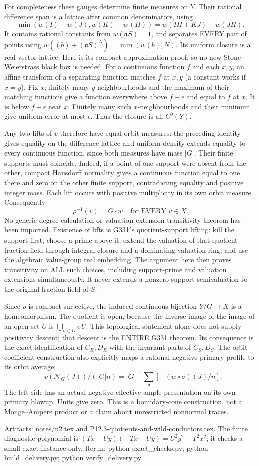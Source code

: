 For completeness these gauges determine finite measures on $Y$.
Their rational difference span is a lattice after common denominators,
using
\[
 \min(w(I)-w(J),w(K)-w(H))=w(IH+KJ)-w(JH).
\]
It contains rational constants from $w(\mathfrak aS)=1$, and separates
EVERY pair of points using $w((b)+(\mathfrak aS)^N)=\min(w(b),N)$.
Its uniform closure is a real vector lattice. Here is its compact
approximation proof, so no new Stone--Weierstrass black box is needed.
For a continuous function $f$ and each $x,y$, an affine transform of a
separating function matches $f$ at $x,y$ (a constant works if $x=y$).
Fix $x$; finitely many $y$-neighbourhoods and the maximum of their matching
functions give a function everywhere above $f-\epsilon$ and equal to
$f$ at $x$. It is below $f+\epsilon$ near $x$. Finitely many such
$x$-neighbourhoods and their minimum give uniform error at most
$\epsilon$. Thus the closure is all $C^0(Y)$.

Any two lifts of $v$ therefore have equal orbit measures: the preceding
identity gives equality on the difference lattice and uniform density
extends equality to every continuous function, since both measures have
mass $|G|$. Their finite supports must coincide. Indeed, if a point of
one support were absent from the other, compact Hausdorff normality gives
a continuous function equal to one there and zero on the other finite
support, contradicting equality and positive integer mass. Each lift
occurs with positive multiplicity in its own orbit measure. Consequently
\[
 \rho^{-1}(v)=G\cdot w\quad\text{for EVERY }v\in X.
\]
No generic degree calculation or valuation-extension transitivity theorem
has been imported. Existence of lifts is G331's quotient-support lifting:
kill the support first, choose a prime above it, extend the valuation of
that quotient fraction field through integral closure and a dominating
valuation ring, and use the algebraic value-group real embedding.
The argument here then proves transitivity on ALL such choices, including
support-prime and valuation extensions simultaneously. It never extends
a nonzero-support semivaluation to the original fraction field of $S$.

Since $\rho$ is compact surjective, the induced continuous bijection
$Y/G\to X$ is a homeomorphism. The quotient is open, because the inverse
image of the image of an open set $U$ is $\bigcup_{\sigma\in G}\sigma U$.
This topological statement alone does not supply positivity descent;
that descent is the ENTIRE G331 theorem. Its consequence is the exact
identification of $C_R,D_R$ with the invariant parts of $C_S,D_S$.
The orbit coefficient construction also explicitly maps a rational
negative primary profile to its orbit average:
\[
 -v(\mathcal N_G(J))/(|G|n)
   =|G|^{-1}\sum_\sigma[-(w\circ\sigma)(J)/n].
\]
The left side has an actual negative effective ample presentation on its
own primary blowup. Units give zero. This is a boundary-cone construction,
not a Monge--Ampere product or a claim about unrestricted nonnormal traces.

Artifacts: notes/n2.tex and P12.3-quotients-and-wild-conductors.tex.
The finite diagnostic polynomial is $(Tx+Uy)(-Tx+Uy)=U^2y^2-T^2x^2$;
it checks a small exact instance only. Rerun: python exact\_checks.py;
python build\_delivery.py; python verify\_delivery.py.
